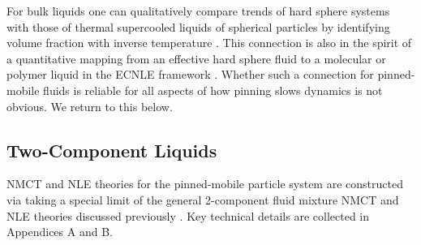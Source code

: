 \documentclass[twocolumn,showpacs,preprintnumbers,amsmath,amssymb,unsortedaddress,
]{revtex4-1}
\begin{document}
For bulk liquids one can qualitatively compare trends of hard sphere systems with those of thermal supercooled liquids of spherical particles by identifying volume fraction with inverse temperature \cite{40}. This connection is also in the spirit of a quantitative mapping from an effective hard sphere fluid to a molecular or polymer liquid in the ECNLE framework \cite{8}. Whether such a connection for pinned-mobile fluids is reliable for all aspects of how pinning slows dynamics is not obvious. We return to this below.

\subsection{Two-Component Liquids}
NMCT and NLE theories for the pinned-mobile particle system are constructed via taking a special limit of the general 2-component fluid mixture NMCT and NLE theories discussed previously \cite{34}. Key technical details are collected in Appendices A and B. 
\end{document}
